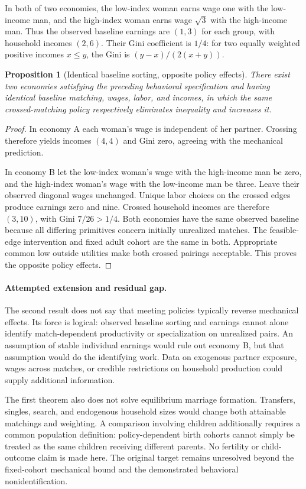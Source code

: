 \documentclass[11pt]{article}
\newtheorem{proposition}[theorem]{Proposition}
\theoremstyle{definition}
\begin{document}
In both of two economies, the low-index woman earns wage one with the low-income man, and the high-index woman earns wage $\sqrt3$ with the high-income man. Thus the observed baseline earnings are $(1,3)$ for each group, with household incomes $(2,6)$. Their Gini coefficient is $1/4$: for two equally weighted positive incomes $x\leq y$, the Gini is $(y-x)/(2(x+y))$.

\begin{proposition}[Identical baseline sorting, opposite policy effects]
There exist two economies satisfying the preceding behavioral specification and having identical baseline matching, wages, labor, and incomes, in which the same crossed-matching policy respectively eliminates inequality and increases it.
\end{proposition}
\begin{proof}
In economy A each woman's wage is independent of her partner. Crossing therefore yields incomes $(4,4)$ and Gini zero, agreeing with the mechanical prediction.

In economy B let the low-index woman's wage with the high-income man be zero, and the high-index woman's wage with the low-income man be three. Leave their observed diagonal wages unchanged. Unique labor choices on the crossed edges produce earnings zero and nine. Crossed household incomes are therefore $(3,10)$, with Gini $7/26>1/4$. Both economies have the same observed baseline because all differing primitives concern initially unrealized matches. The feasible-edge intervention and fixed adult cohort are the same in both. Appropriate common low outside utilities make both crossed pairings acceptable. This proves the opposite policy effects.
\end{proof}

\paragraph{Attempted extension and residual gap.}
The second result does not say that meeting policies typically reverse mechanical effects. Its force is logical: observed baseline sorting and earnings cannot alone identify match-dependent productivity or specialization on unrealized pairs. An assumption of stable individual earnings would rule out economy B, but that assumption would do the identifying work. Data on exogenous partner exposure, wages across matches, or credible restrictions on household production could supply additional information.

The first theorem also does not solve equilibrium marriage formation. Transfers, singles, search, and endogenous household sizes would change both attainable matchings and weighting. A comparison involving children additionally requires a common population definition: policy-dependent birth cohorts cannot simply be treated as the same children receiving different parents. No fertility or child-outcome claim is made here. The original target remains unresolved beyond the fixed-cohort mechanical bound and the demonstrated behavioral nonidentification.
\end{document}
